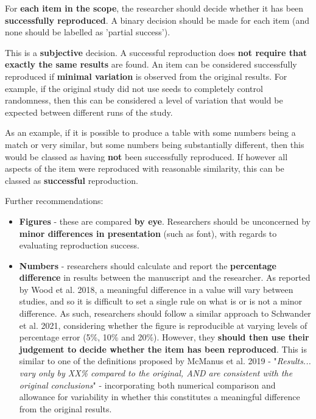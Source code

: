 For \textbf{each item in the scope}, the researcher should decide whether it has been \textbf{successfully reproduced}. A binary decision should be made for each item (and none should be labelled as 'partial success').

This is a \textbf{subjective} decision. A successful reproduction does \textbf{not require that exactly the same results} are found. An item can be considered successfully reproduced if \textbf{minimal variation} is observed from the original results. For example, if the original study did not use seeds to completely control randomness, then this can be considered a level of variation that would be expected between different runs of the study.

As an example, if it is possible to produce a table with some numbers being a match or very similar, but some numbers being substantially different, then this would be classed as having \textbf{not} been successfully reproduced. If however all aspects of the item were reproduced with reasonable similarity, this can be classed as \textbf{successful} reproduction.

Further recommendations:
\begin{itemize}
    \item \textbf{Figures} - these are compared \textbf{by eye}. Researchers should be unconcerned by \textbf{minor differences in presentation} (such as font), with regards to evaluating reproduction success.
    \item \textbf{Numbers} - researchers should calculate and report the \textbf{percentage difference} in results between the manuscript and the researcher. As reported by Wood et al. 2018,\autocite{wood_push_2018, wood_replication_2018} a meaningful difference in a value will vary between studies, and so it is difficult to set a single rule on what is or is not a minor difference. As such, researchers should follow a similar approach to Schwander et al. 2021,\autocite{schwander_replication_2021} considering whether the figure is reproducible at varying levels of percentage error (5\%, 10\% and 20\%). However, they \textbf{should then use their judgement to decide whether the item has been reproduced}. This is similar to one of the definitions proposed by McManus et al. 2019\autocite{mcmanus_can_2019} - "\textit{Results... vary only by XX\% compared to the original, AND are consistent with the original conclusions}" - incorporating both numerical comparison and allowance for variability in whether this constitutes a meaningful difference from the original results.
\end{itemize}

